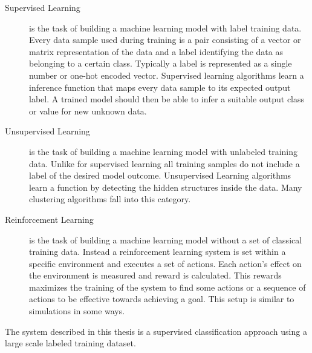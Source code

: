 	\begin{description}
		\item[Supervised Learning] is the task of building a machine learning model with label training data. Every data sample used during training is a pair consisting of a vector or matrix representation of the data and a label identifying the data as belonging to a certain class. Typically a label is represented as a single number or one-hot encoded vector. Supervised learning algorithms learn a inference function that maps every data sample to its expected output label. A trained model should then be able to infer a suitable output class or value for new unknown data. 
				
		\item[Unsupervised Learning] is the task of building a machine learning model with unlabeled training data. Unlike for supervised learning all training samples do not include a label of the desired model outcome. Unsupervised Learning algorithms learn a function by  detecting the hidden structures inside the data. Many clustering algorithms fall into this category.
		
		\item[Reinforcement Learning] is the task of building a machine learning model without a set of classical training data. Instead a reinforcement learning system is set within a specific environment and executes a set of actions. Each action's effect on the environment is measured and reward is calculated. This rewards maximizes the training of the system to find some actions or a sequence of actions to be effective towards achieving a goal. This setup is similar to simulations in some ways. 
	\end{description}

The system described in this thesis is a supervised classification approach using a large scale labeled training dataset.

